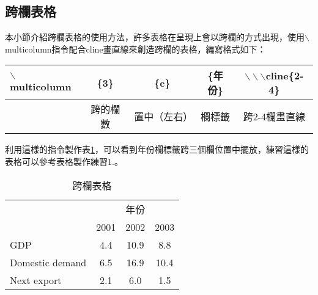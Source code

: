 \newpage
\subsection{{\CR 跨欄表格}}
本小節介紹跨欄表格的使用方法，許多表格在呈現上會以跨欄的方式出現，使用$\backslash$multicolumn指令配合cline畫直線來創造跨欄的表格，編寫格式如下：\\
\begin{table}[h] 
	\centering
	\begin{tabular}{p{}cccc}
	\rowcolor{slight}
	{\C $\backslash$multicolumn} & \{3\} & \{c\} & \{年份\}  & $\backslash\backslash\backslash$cline\{2-4\} \\\toprule[1.2pt]
				&	  跨的欄數 & 置中（左右）& 欄標籤 & 跨2-4欄畫直線 \\
	\end{tabular}
\end{table}

利用這樣的指令製作表\ref{mul}，可以看到年份欄標籤跨三個欄位置中擺放，練習這樣的表格可以參考表格製作練習1.。
\begin{table}[h] 
	\centering 
	\caption{跨欄表格}\label{mul}  
	\extrarowheight=3pt   
	\begin{tabular}{lccc}
     \hline  
     		& \multicolumn{3}{c}{年份}\\\cline{2-4}
			& 2001 & 2002 & 2003  \\\hline
  GDP  & 4.4  & 10.9 & 8.8		\\\hline  
  Domestic demand     & 6.5     & 16.9 & 10.4		\\\hline
  Next export  & 2.1     & 6.0	& 1.5		\\\hline
	\end{tabular}
\end{table}

\newpage

